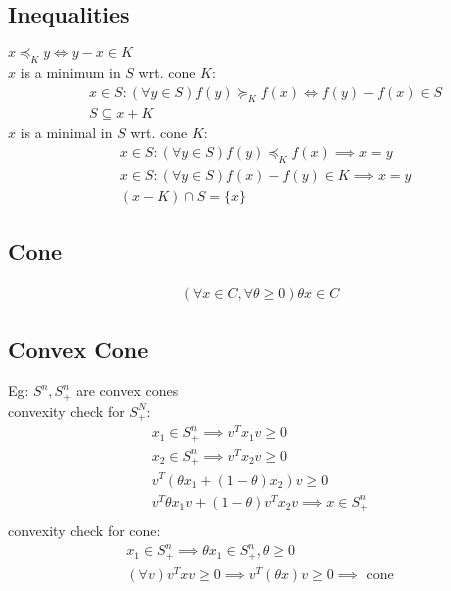 \documentclass[8pt]{report}
\newcommand{\set}[1]{\{#1\}}
\begin{document}
\begin{multicols*}{2}
  \vfill\null
  \columnbreak

  \subsection{Inequalities}
  $x \preceq_K y \iff y-x \in K$\\
  
  $x$ is a minimum in $S$ wrt. cone $K$:
  \begin{align*}
    &x \in S: (\forall y \in S)f(y) \succeq_K f(x) \iff f(y)-f(x) \in S\\
    &S \subseteq x+K
  \end{align*}
  $x$ is a minimal in $S$ wrt. cone $K$:
  \begin{align*}
    &x \in S: (\forall y \in S)f(y) \preceq_K f(x) \implies x = y\\
    &x \in S: (\forall y \in S) f(x)-f(y) \in K \implies x = y\\
    &(x-K) \cap S = \set{x}
  \end{align*}
  \subsection{Cone}
  \begin{align*}
    (\forall x \in C, \forall \theta \geq 0) \theta x \in C
  \end{align*}
  \subsection{Convex Cone}
  Eg: $S^n, S^n_+$ are convex cones\\
  convexity check for $S^N_+$:\\
  \begin{align*}
    x_1 \in S^n_+ \implies v^Tx_1v \geq 0\\
    x_2 \in S^n_+ \implies v^Tx_2v \geq 0\\
    v^T(\theta x_1 + (1-\theta)x_2)v \geq 0\\
    v^T\theta x_1 v + (1-\theta)v^T x_2 v \implies x \in S^n_+\\
  \end{align*}
  convexity check for cone:\\
  \begin{align*}
    x_1 \in S^n_+ \implies \theta x_1 \in S^n_+, \theta \geq 0\\
    (\forall v) v^T x v \geq 0 \implies v^T(\theta x) v \geq 0 \implies \text{ cone}
  \end{align*}
  

\end{multicols*}
\end{document}
